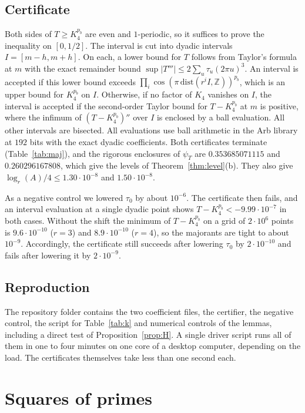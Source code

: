 \documentclass[11pt]{amsart}
\theoremstyle{definition}
\numberwithin{equation}{section}
\newcommand{\Z}{\mathbb{Z}}
\begin{document}
\subsection{Certificate}
Both sides of $T\ge K_4^{p_b}$ are even and $1$-periodic, so it suffices to prove the inequality on $[0,1/2]$. The interval is cut into dyadic intervals $I=[m-h,m+h]$. On each, a lower bound for $T$ follows from Taylor's formula at $m$ with the exact remainder bound $\sup\lvert T'''\rvert\le2\sum_u\tau_u(2\pi u)^3$. An interval is accepted if this lower bound exceeds $\prod_i\cos(\pi\,\mathrm{dist}(r^iI,\Z))^{p_b}$, which is an upper bound for $K_4^{p_b}$ on $I$. Otherwise, if no factor of $K_4$ vanishes on $I$, the interval is accepted if the second-order Taylor bound for $T-K_4^{p_b}$ at $m$ is positive, where the infimum of $(T-K_4^{p_b})''$ over $I$ is enclosed by a ball evaluation. All other intervals are bisected. All evaluations use ball arithmetic in the Arb library at $192$ bits with the exact dyadic coefficients. Both certificates terminate (Table~\ref{tab:maj}), and the rigorous enclosures of $\psi_T$ are $0.353685071115$ and $0.260296167808$, which give the levels of Theorem~\ref{thm:level}(b). They also give $\log_r(A)/4\le1.30\cdot10^{-8}$ and $1.50\cdot10^{-8}$.

As a negative control we lowered $\tau_0$ by about $10^{-6}$. The certificate then fails, and an interval evaluation at a single dyadic point shows $T-K_4^{p_b}<-9.99\cdot10^{-7}$ in both cases. Without the shift the minimum of $T-K_4^{p_b}$ on a grid of $2\cdot10^6$ points is $9.6\cdot10^{-10}$ ($r=3$) and $8.9\cdot10^{-10}$ ($r=4$), so the majorants are tight to about $10^{-9}$. Accordingly, the certificate still succeeds after lowering $\tau_0$ by $2\cdot10^{-10}$ and fails after lowering it by $2\cdot10^{-9}$.

\subsection{Reproduction}
The repository folder contains the two coefficient files, the certifier, the negative control, the script for Table~\ref{tab:k} and numerical controls of the lemmas, including a direct test of Proposition~\ref{prop:H}. A single driver script runs all of them in one to four minutes on one core of a desktop computer, depending on the load. The certificates themselves take less than one second each.

\section{Squares of primes}\label{sec:squares}
\end{document}
